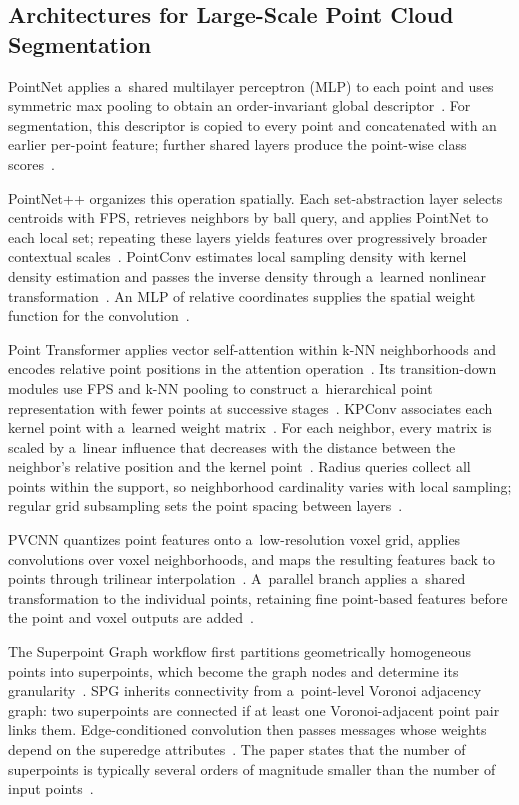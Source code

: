 \subsection{Architectures for Large-Scale Point Cloud Segmentation}

PointNet applies a~shared multilayer perceptron (MLP) to each point and uses symmetric max pooling to obtain an order-invariant global descriptor~\citep{pointnet}. For segmentation, this descriptor is copied to every point and concatenated with an earlier per-point feature; further shared layers produce the point-wise class scores~\citep{pointnet}.

PointNet++ organizes this operation spatially. Each set-abstraction layer selects centroids with FPS, retrieves neighbors by ball query, and applies PointNet to each local set; repeating these layers yields features over progressively broader contextual scales~\citep{pointnetpp}. PointConv estimates local sampling density with kernel density estimation and passes the inverse density through a~learned nonlinear transformation~\citep{pointconv}. An MLP of relative coordinates supplies the spatial weight function for the convolution~\citep{pointconv}.

Point Transformer applies vector self-attention within k-NN neighborhoods and encodes relative point positions in the attention operation~\citep{pointtransformer}. Its transition-down modules use FPS and k-NN pooling to construct a~hierarchical point representation with fewer points at successive stages~\citep{pointtransformer}. KPConv associates each kernel point with a~learned weight matrix~\citep{kpconv}. For each neighbor, every matrix is scaled by a~linear influence that decreases with the distance between the neighbor's relative position and the kernel point~\citep{kpconv}. Radius queries collect all points within the support, so neighborhood cardinality varies with local sampling; regular grid subsampling sets the point spacing between layers~\citep{kpconv}.

PVCNN quantizes point features onto a~low-resolution voxel grid, applies convolutions over voxel neighborhoods, and maps the resulting features back to points through trilinear interpolation~\citep{pvcnn}. A~parallel branch applies a~shared transformation to the individual points, retaining fine point-based features before the point and voxel outputs are added~\citep{pvcnn}.

The Superpoint Graph workflow first partitions geometrically homogeneous points into superpoints, which become the graph nodes and determine its granularity~\citep{spg}. SPG inherits connectivity from a~point-level Voronoi adjacency graph: two superpoints are connected if at least one Voronoi-adjacent point pair links them. Edge-conditioned convolution then passes messages whose weights depend on the superedge attributes~\citep{spg}. The paper states that the number of superpoints is typically several orders of magnitude smaller than the number of input points~\citep{spg}.

